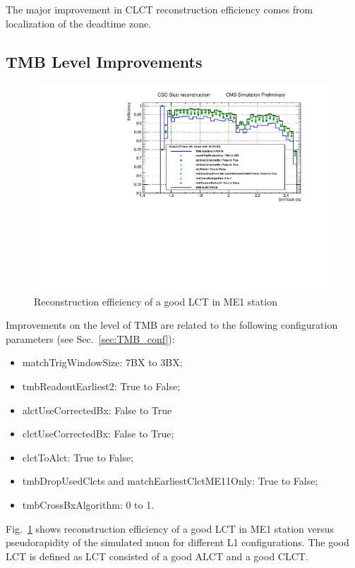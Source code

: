 The major improvement in CLCT reconstruction efficiency comes from localization of the deadtime zone.

\newpage

\subsection{TMB Level Improvements}

\begin{figure}[htb]
\includegraphics[width=0.98\textwidth]{figures/TMB_improvements_LCT_recoEff.pdf}
\caption{Reconstruction efficiency of a good LCT in ME1 station}
\label{fig:TMB_improvements_LCT_recoEff}
\end{figure}

Improvements on the level of TMB are related to the following configuration parameters (see Sec.~\ref{sec:TMB_conf}):
\begin{itemize}
	\item matchTrigWindowSize: 7BX to 3BX;
	\item tmbReadoutEarliest2: True to False;
	\item alctUseCorrectedBx: False to True
	\item clctUseCorrectedBx: False to True;
	\item clctToAlct: True to False;
	\item tmbDropUsedClcts and matchEarliestClctME11Only: True to False;
	\item tmbCrossBxAlgorithm: 0 to 1.
\end{itemize}

Fig.~\ref{fig:TMB_improvements_LCT_recoEff} shows reconstruction efficiency of a good LCT in ME1 station versus pseudorapidity of the simulated muon for different L1 configurations. The good LCT is defined as LCT consisted of a good ALCT and a good CLCT.

